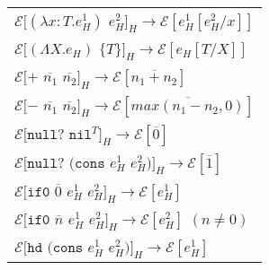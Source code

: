 \begin{figure}[p]
\centering
\begin{tabular}{l}
\vspace{5pt}

$\mathscr{E}[(\lambda x:T.e_{H}^{1})$ $e_{H}^{2}]_{H}\rightarrow\mathscr{E}[e_{H}^{1}[e_{H}^{2}/x]]$ \\

\vspace{5pt}

$\mathscr{E}[(\Lambda X.e_{H})$ $\lbrace T\rbrace]_{H}\rightarrow\mathscr{E}[e_{H}[T/X]]$ \\

\vspace{5pt}

$\mathscr{E}[+$ $\overline{n_{1}}$ $\overline{n_{2}}]_{H}\rightarrow\mathscr{E}[\overline{n_{1}+n_{2}}]$ \\

\vspace{5pt}

$\mathscr{E}[-$ $\overline{n_{1}}$ $\overline{n_{2}}]_{H}\rightarrow\mathscr{E}[\overline{max(n_{1}-n_{2},0)}]$ \\

\vspace{5pt}

$\mathscr{E}[\mathtt{null?}$ $\mathtt{nil}^{T}]_{H}\rightarrow\mathscr{E}[\overline{0}]$ \\

\vspace{5pt}

$\mathscr{E}[\mathtt{null?}$ $(\mathtt{cons}$ $e_{H}^{1}$ $e_{H}^{2})]_{H}\rightarrow\mathscr{E}[\overline{1}]$ \\

\vspace{5pt}

$\mathscr{E}[\mathtt{if0}$ $\overline{0}$ $e_{H}^{1}$ $e_{H}^{2}]_{H}\rightarrow\mathscr{E}[e_{H}^{1}]$ \\

\vspace{5pt}

$\mathscr{E}[\mathtt{if0}$ $\overline{n}$ $e_{H}^{1}$ $e_{H}^{2}]_{H}\rightarrow\mathscr{E}[e_{H}^{2}]$ $(n\neq0)$ \\

\vspace{5pt}

$\mathscr{E}[\mathtt{hd}$ $(\mathtt{cons}$ $e_{H}^{1}$ $e_{H}^{2})]_{H}\rightarrow\mathscr{E}[e_{H}^{1}]$ \\


\end{tabular}
\end{figure}
